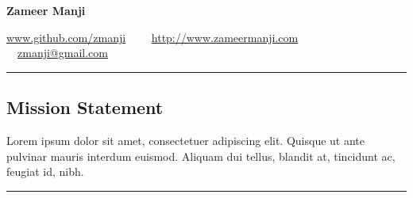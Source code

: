 \documentclass[10pt,letterpaper]{article}
\begin{document}
\begin{center}
{\huge \textbf{Zameer Manji}}


\href{http://www.github.com/zmanji/}{www.github.com/zmanji}\ \ \textbullet
\ \ \href{http://www.zameermanji.com}{http://www.zameermanji.com}\ \ \textbullet
\ \ \href{malto:zmanji@gmail.com}{zmanji@gmail.com}

\end{center}

\hrule
\vspace{-0.4em}
\subsection*{Mission Statement}

Lorem ipsum dolor sit amet, consectetuer adipiscing elit. Quisque ut ante
pulvinar mauris interdum euismod. Aliquam dui tellus, blandit at, tincidunt ac,
feugiat id, nibh.
\\

\hrule
\vspace{-0.4em}
\end{document}
